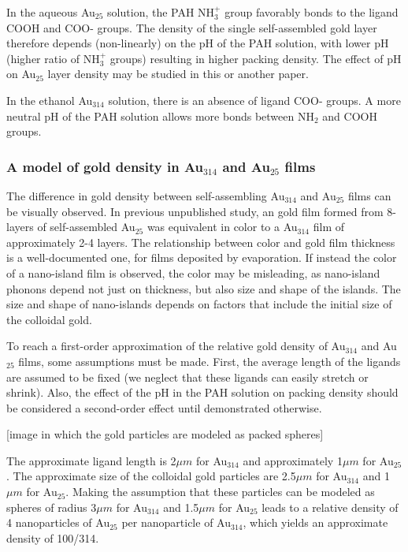 \documentclass[12pt,oneside,english]{article}
\begin{document}
	In the aqueous Au$_{25}$ solution, the PAH NH$_3^+$ group favorably bonds to the ligand COOH and COO- groups.
	The density of the single self-assembled gold layer therefore depends (non-linearly) on the pH of the PAH solution, with lower pH (higher ratio of NH$_3^+$ groups) resulting in higher packing density.
	The effect of pH on Au$_{25}$ layer density may be studied in this or another paper.
	
	In the ethanol Au$_{314}$ solution, there is an absence of ligand COO- groups.
	A more neutral pH of the PAH solution allows more bonds between NH$_2$ and COOH groups.
	
	\subsubsection{A model of gold density in Au$_{314}$ and Au$_{25}$ films}
	The difference in gold density between self-assembling Au$_{314}$ and Au$_{25}$ films can be visually observed.
	In previous unpublished study, an gold film formed from 8-layers of self-assembled Au$_{25}$ was equivalent in color to a Au$_{314}$ film of approximately 2-4 layers.
	The relationship between color and gold film thickness is a well-documented one, for films deposited by evaporation.
	If instead the color of a nano-island film is observed, the color may be misleading, as nano-island phonons depend not just on thickness, but also size and shape of the islands.  
	The size and shape of nano-islands depends on factors that include the initial size of the colloidal gold.
	
	To reach a first-order approximation of the relative gold density of Au$_{314}$ and Au$_{25}$ films, some assumptions must be made.
	First, the average length of the ligands are assumed to be fixed (we neglect that these ligands can easily stretch or shrink).
	Also, the effect of the pH in the PAH solution on packing density should be considered a second-order effect until demonstrated otherwise.	
	
	[image in which the gold particles are modeled as packed spheres]	
	
	The approximate ligand length is 2${\mu}m$ for Au$_{314}$ and approximately 1${\mu}m$ for Au$_{25}$.
	The approximate size of the colloidal gold particles are 2.5${\mu}m$ for Au$_{314}$ and 1${\mu}m$ for Au$_{25}$.
	Making the assumption that these particles can be modeled as spheres of radius 3${\mu}m$ for Au$_{314}$ and 1.5${\mu}m$ for Au$_{25}$ leads to a relative density of 4 nanoparticles of Au$_{25}$ per nanoparticle of Au$_{314}$, which yields an approximate density of 100/314.
	
\end{document}
